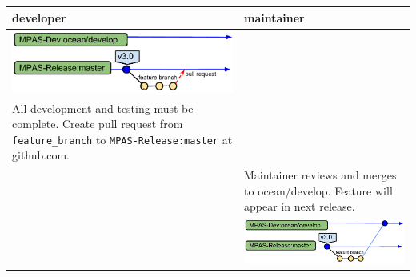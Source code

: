 \documentclass[11pt]{article}
\begin{document}
\begin{enumerate}
\begin{centering}
\end{centering}
 \begin{tabular}[c]{L{3.3in}|L{3.3in}}
developer & maintainer \\
\hline
\includegraphics[width=3.25in]{f/MPASworkflow_ext3.pdf} \\
All development and testing must be complete.
Create pull request from \verb|feature_branch| to \verb|MPAS-Release:master| at github.com. \\
& Maintainer reviews and merges to ocean/develop.  Feature will appear in next release.\\
& \includegraphics[width=3.25in]{f/MPASworkflow_ext4.pdf} \\
 \end{tabular}


\end{enumerate}



\end{document}
